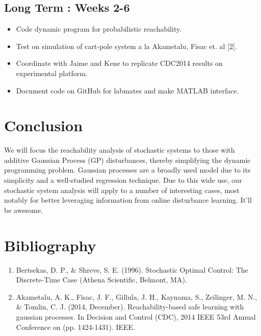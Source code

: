\documentclass[a4paper]{article}
\begin{document}
\subsection{Long Term : Weeks 2-6}
\begin{itemize}
\item Code dynamic program for probabilistic reachability.
\item Test on simulation of cart-pole system a la Akametalu, Fisac et. al [2].
\item Coordinate with Jaime and Kene to replicate CDC2014 results on experimental platform.
\item Document code on GitHub for labmates and make MATLAB interface.
\end{itemize}

\section{Conclusion}
We will focus the reachability analysis of stochastic systems to those with additive Gaussian Process (GP) disturbances, thereby simplifying the dynamic programming problem. Gaussian processes are a broadly used model due to its simplicity and a well-studied regression technique. Due to this wide use, our stochastic system analysis will apply to a number of interesting cases, most notably for better leveraging information from online disturbance learning. It'll be awesome.

\section{Bibliography}
\begin{enumerate}
\item Bertsekas, D. P., \& Shreve, S. E. (1996). Stochastic Optimal Control: The Discrete-Time Case (Athena Scientific, Belmont, MA).

\item Akametalu, A. K., Fisac, J. F., Gillula, J. H., Kaynama, S., Zeilinger, M. N., \& Tomlin, C. J. (2014, December). Reachability-based safe learning with gaussian processes. In Decision and Control (CDC), 2014 IEEE 53rd Annual Conference on (pp. 1424-1431). IEEE.
\end{enumerate}
\end{document}

